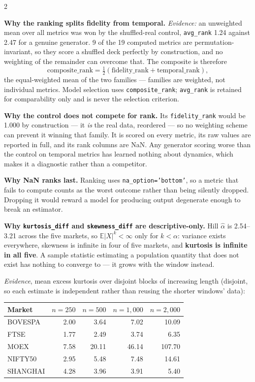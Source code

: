 \documentclass[10pt]{article}
\newcommand{\E}{\mathbb{E}}
\begin{document}
\begin{multicols}{2}
\small

\textbf{Why the ranking splits fidelity from temporal.}
\textit{Evidence:} an unweighted mean over all metrics was won by the shuffled-real control, \texttt{avg\_rank} 1.24 against 2.47 for a genuine generator. 9 of the 19 computed metrics are permutation-invariant, so they score a shuffled deck perfectly by construction, and no weighting of the remainder can overcome that. The composite is therefore
\[ \text{composite\_rank} = \tfrac{1}{2}\left(\text{fidelity\_rank} + \text{temporal\_rank}\right), \]
the equal-weighted mean of the two families --- families are weighted, not individual metrics. Model selection uses \texttt{composite\_rank}; \texttt{avg\_rank} is retained for comparability only and is never the selection criterion.

\smallskip
\textbf{Why the control does not compete for rank.}
Its \texttt{fidelity\_rank} would be 1.000 by construction --- it \emph{is} the real data, reordered --- so no weighting scheme can prevent it winning that family. It is scored on every metric, its raw values are reported in full, and its rank columns are NaN. Any generator scoring worse than the control on temporal metrics has learned nothing about dynamics, which makes it a diagnostic rather than a competitor.

\smallskip
\textbf{Why NaN ranks last.}
Ranking uses \texttt{na\_option='bottom'}, so a metric that fails to compute counts as the worst outcome rather than being silently dropped. Dropping it would reward a model for producing output degenerate enough to break an estimator.

\smallskip
\textbf{Why \texttt{kurtosis\_diff} and \texttt{skewness\_diff} are descriptive-only.}
Hill $\hat\alpha$ is 2.54--3.21 across the five markets, so $\E|X|^k<\infty$ only for $k<\alpha$: variance exists everywhere, skewness is infinite in four of five markets, and \textbf{kurtosis is infinite in all five}. A sample statistic estimating a population quantity that does not exist has nothing to converge to --- it grows with the window instead.

\textit{Evidence}, mean excess kurtosis over disjoint blocks of increasing length (disjoint, so each estimate is independent rather than reusing the shorter windows' data):

\smallskip
{\footnotesize
\begin{tabular}{@{}lrrrr@{}}
\toprule
Market & $n=250$ & $n=500$ & $n=1{,}000$ & $n=2{,}000$ \\
\midrule
BOVESPA & 2.00 & 3.64 & 7.02 & 10.09 \\
FTSE & 1.77 & 2.49 & 3.74 & 6.35 \\
MOEX & 7.58 & 20.11 & 46.14 & 107.70 \\
NIFTY50 & 2.95 & 5.48 & 7.48 & 14.61 \\
SHANGHAI & 4.28 & 3.96 & 3.91 & 5.40 \\
\bottomrule
\end{tabular}}


\end{multicols}
\end{document}
